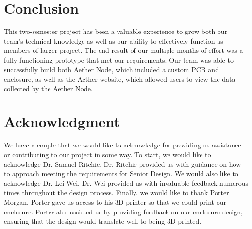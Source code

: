 \documentclass[conference]{IEEEtran}
\begin{document}
\section{Conclusion}
This two-semester project has been a valuable experience to grow both our team's technical knowledge as well as our ability to effectively function as members of larger project. The end result of our multiple months of effort was a fully-functioning prototype that met our requirements. Our team was able to successfully build both Aether Node, which included a custom PCB and enclosure, as well as the Aether website, which allowed users to view the data collected by the Aether Node.

\section*{Acknowledgment}
We have a couple that we would like to acknowledge for providing us assistance or contributing to our project in some way. To start, we would like to acknowledge Dr. Samuel Ritchie. Dr. Ritchie provided us with guidance on how to approach meeting the requirements for Senior Design. We would also like to acknowledge Dr. Lei Wei. Dr. Wei provided us with invaluable feedback numerous times throughout the design process. Finally, we would like to thank Porter Morgan. Porter gave us access to his 3D printer so that we could print our enclosure. Porter also assisted us by providing feedback on our enclosure design, ensuring that the design would translate well to being 3D printed.
\end{document}
